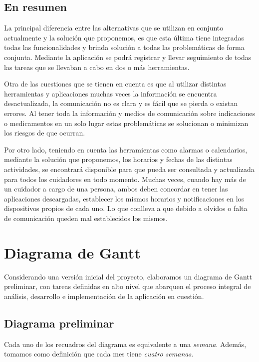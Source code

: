 \documentclass[a4paper,12pt]{article}
\begin{document}
    \subsection{En resumen}
    \par La principal diferencia entre las alternativas que se utilizan en conjunto actualmente y la solución que proponemos, es que esta última tiene integradas todas las funcionalidades y brinda solución a todas las problemáticas de forma conjunta. Mediante la aplicación se podrá registrar y llevar seguimiento de todas las tareas que se llevaban a cabo en dos o más herramientas.
    \par Otra de las cuestiones que se tienen en cuenta es que al utilizar distintas herramientas y aplicaciones muchas veces la información se encuentra desactualizada, la comunicación no es clara y es fácil que se pierda o existan errores. Al tener toda la información y medios de comunicación sobre indicaciones o medicamentos en un solo lugar estas problemáticas se solucionan o minimizan los riesgos de que ocurran.
    \par Por otro lado, teniendo en cuenta las herramientas como alarmas o calendarios, mediante la solución que proponemos, los horarios y fechas de las distintas actividades, se encontrará disponible para que pueda ser consultada y actualizada para todos los cuidadores en todo momento. Muchas veces, cuando hay más de un cuidador a cargo de una persona, ambos deben concordar en tener las aplicaciones descargadas, establecer los mismos horarios y notificaciones en los dispositivos propios de cada uno. Lo que conlleva a que debido a olvidos o falta de comunicación queden mal establecidos los mismos.

    \newpage

    \section{Diagrama de Gantt}
    \par Considerando una versión inicial del proyecto, elaboramos un diagrama de Gantt preliminar, con tareas definidas en alto nivel que abarquen el proceso integral de análisis, desarrollo e implementación de la aplicación en cuestión.
    \subsection{Diagrama preliminar}
    \par Cada uno de los recuadros del diagrama es equivalente a una \textit{semana}. Además, tomamos como definición que cada mes tiene \textit{cuatro semanas}.
    
\end{document}
